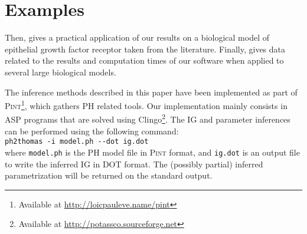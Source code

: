 \section{Examples}\label{sec:examples}

%
Then,  gives a practical application of our results on a biological model
of epithelial growth factor receptor taken from the literature.
Finally,  gives data related to the results and computation times of our software
when applied to several large biological models.

\medskip

The inference  methods described in this paper have been implemented as part of
\textsc{Pint}\footnote{Available at \url{http://loicpauleve.name/pint}}, which gathers PH related tools.
Our implementation mainly consists in ASP programs that are solved using
Clingo\footnote{Available at \url{http://potassco.sourceforge.net}}.
The IG and parameter inferences can be performed using the following command:\\
  \hspace*{\parindent}\texttt{ph2thomas -i model.ph -{}-dot ig.dot}\\
where \texttt{model.ph} is the PH model file in \textsc{Pint} format,
and \texttt{ig.dot} is an output file to write the inferred IG in DOT format.
The (possibly partial) inferred parametrization will be returned on the standard output.
%



